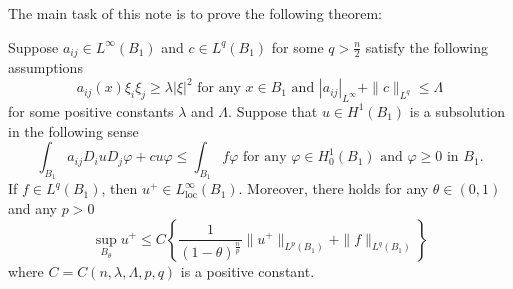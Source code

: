 The main task of this note is to prove the following theorem:
\begin{theorem}
 Suppose $a_{ij}\in L^{\infty}(B_1)$ and $c\in L^{q}(B_1)$ for some $q>\frac{n}{2}$ satisfy the following assumptions
  \[
    a_{ij}(x)\xi_i\xi_j\ge \lambda \left| \xi \right| ^{2}\text{ for any }x\in B_1 \text{ and }\left| a_{ij} \right| _{L^{\infty}}+\|c\|_{L^{q}}\le \Lambda
  \] 
  for some positive constants $\lambda$ and $\Lambda$. Suppose that  $u\in H^{1}(B_1)$ is a subsolution in the following sense
  \[
    \int_{B_1}a_{ij}D_iuD_j\varphi+cu\varphi\le \int_{B_1}f\varphi \text{ for any }\varphi \in H_0^{1}(B_1) \text{ and } \varphi\ge 0 \text{ in }B_1.
  \] 
  If $f\in L^{q}(B_1)$, then $u^{+}\in L_{\mathrm{loc}}^{\infty}(B_1)$. Moreover, there holds for any $\theta \in  (0,1)$ and any $p>0$ 
  \[
    \sup_{B_{\theta}}u^{+}\le C\left\lbrace \frac{1}{(1-\theta)^{\frac{n}{p}}}\|u^{+}\|_{L^{p}(B_1)}+\|f\|_{L^{q}(B_1)}  \right\rbrace
  \]
  where $C=C(n,\lambda,\Lambda,p,q)$ is a positive constant.
\end{theorem}

